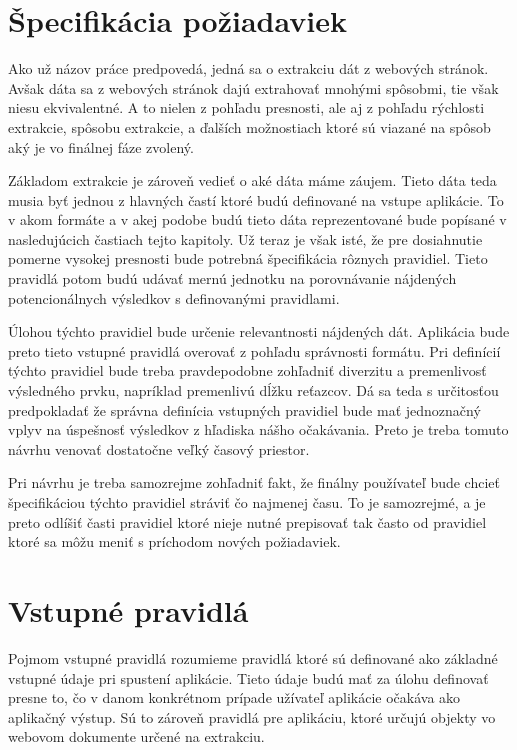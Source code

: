 \section{Špecifikácia požiadaviek}

Ako už názov práce predpovedá, jedná sa o extrakciu dát z webových stránok. Avšak dáta sa z webových stránok dajú extrahovať mnohými spôsobmi, tie však niesu ekvivalentné. A to nielen z pohľadu presnosti, ale aj z pohľadu rýchlosti extrakcie, spôsobu extrakcie, a ďalších možnostiach ktoré sú viazané na spôsob aký je vo finálnej fáze zvolený.

Základom extrakcie je zároveň vedieť o aké dáta máme záujem. Tieto dáta teda musia byť jednou z hlavných častí ktoré budú definované na vstupe aplikácie. To v akom formáte a v akej podobe budú tieto dáta reprezentované bude popísané v nasledujúcich častiach tejto kapitoly. Už teraz je však isté, že pre dosiahnutie pomerne vysokej presnosti bude potrebná špecifikácia rôznych pravidiel. Tieto pravidlá potom budú udávať mernú jednotku na porovnávanie nájdených potencionálnych výsledkov s definovanými pravidlami.

Úlohou týchto pravidiel bude určenie relevantnosti nájdených dát. Aplikácia bude preto tieto vstupné pravidlá overovať z pohľadu správnosti formátu. Pri definícií týchto pravidiel bude treba pravdepodobne zohľadniť diverzitu a premenlivosť výsledného prvku, napríklad premenlivú dĺžku reťazcov. Dá sa teda s určitosťou predpokladať že správna definícia vstupných pravidiel bude mať jednoznačný vplyv na úspešnosť výsledkov z hľadiska nášho očakávania. Preto je treba tomuto návrhu venovať dostatočne veľký časový priestor.

Pri návrhu je treba samozrejme zohľadniť fakt, že finálny používateľ bude chcieť špecifikáciou týchto pravidiel stráviť čo najmenej času. To je samozrejmé, a je preto odlíšiť časti pravidiel ktoré nieje nutné prepisovať tak často od pravidiel ktoré sa môžu meniť s príchodom nových požiadaviek.

\newpage
\section{Vstupné pravidlá}

Pojmom vstupné pravidlá rozumieme pravidlá ktoré sú definované ako základné vstupné údaje pri spustení aplikácie. Tieto údaje budú mať za úlohu definovať presne to, čo v danom konkrétnom prípade užívateľ aplikácie očakáva ako aplikačný výstup. Sú to zároveň pravidlá pre aplikáciu, ktoré určujú objekty vo webovom dokumente určené na extrakciu.

